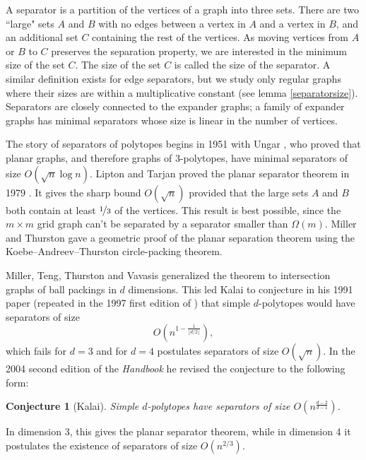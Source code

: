 \documentclass[a4paper,12pt]{book}
\theoremstyle{plain}
\newtheorem{conjecture}[theorem]{Conjecture}
\theoremstyle{definition}
\begin{document}
A separator is a partition of the vertices of a graph into three sets. There are two ``large" sets $A$ and $B$ with no edges
between a vertex in $A$ and a vertex in $B$, and 
an additional set $C$ containing the rest of the vertices. As moving vertices from $A$ or $B$ to
$C$ preserves the separation property, we are interested in the minimum size of the set $C$. 
The size of the set $C$ is called the size of the separator. A similar definition exists for edge separators, but we study
only regular graphs where their sizes are within a multiplicative constant (see lemma \ref{separatorsize}).
Separators are closely connected to the expander graphs; a family of expander graphs has minimal separators
whose size is linear in the number of vertices.

The story of separators of polytopes begins in 1951 with Ungar \cite{Ungar1951},
who proved that planar graphs, and therefore graphs of 3-polytopes, have minimal 
separators of size $O(\sqrt{n} \log n)$. Lipton and Tarjan proved the planar 
separator theorem in 1979 \cite{LiTa}. It gives the sharp bound
$O(\sqrt{n})$ provided that the large sets $A$ and $B$ both contain at least $\nicefrac{1}{3}$ of the vertices.
This result is best possible, since the $m\times m$ grid graph
can't be separated by a separator smaller than $\Omega(m)$. Miller and Thurston \cite{MillerThurston-separators} gave a 
geometric proof of the planar separation theorem using the  
Koebe–Andreev–Thurston circle-packing theorem.

Miller, Teng, Thurston and Vavasis \cite{MillerTengThurstonVavasis} generalized 
the theorem to intersection graphs of ball packings in $d$ dimensions. This 
led Kalai to conjecture in his 1991 paper \cite[Conj 12.1.]{Ka2}(repeated in the 1997 first edition of \cite{Kal97} ) that 
simple $d$-polytopes would have separators of size
\begin{equation}
O\left(n^{1-\frac{1}{\lfloor d/2 \rfloor}}\right),
\end{equation}
which fails for $d=3$ and for $d=4$ postulates separators of size $O(\sqrt{n})$. In the 2004 second edition of
the \textit{Handbook} \cite[Conj. 20.2.12]{kalai04:_polyt} he revised the conjecture to the following form:
\begin{conjecture}[Kalai]
\label{simpleconjecture}
Simple $d$-polytopes have separators of size
$O \left(n^{\frac{d-2}{d-1}}\right)$.
\end{conjecture}
In dimension 3, this gives the planar separator theorem, while in dimension 4 it postulates the existence
of separators of size $O(n^{2/3}).$
\end{document}
